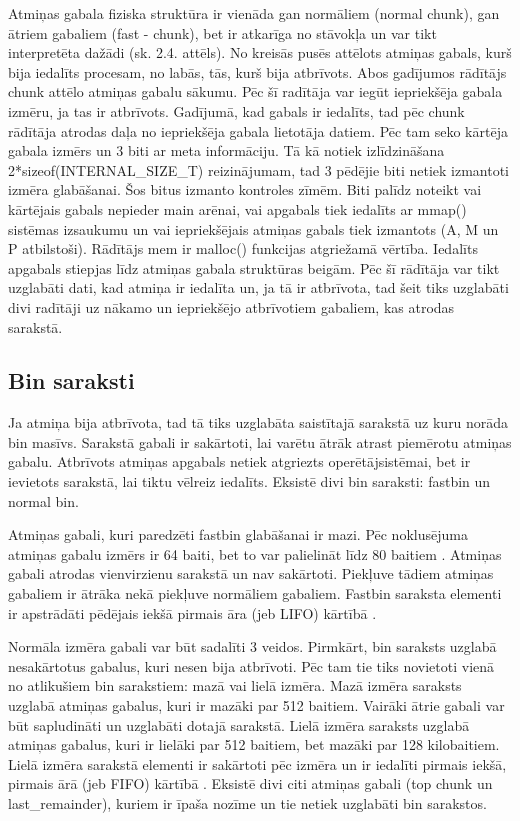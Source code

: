 Atmiņas gabala fiziska struktūra ir vienāda gan normāliem (normal chunk), gan ātriem gabaliem (fast - chunk), bet ir atkarīga no stāvokļa un var tikt interpretēta dažādi (sk. 2.4. attēls).
No kreisās pusēs attēlots atmiņas gabals, kurš bija iedalīts procesam, no labās, tās, kurš bija atbrīvots.
Abos gadījumos rādītājs chunk attēlo atmiņas gabalu sākumu. Pēc šī radītāja var iegūt iepriekšēja gabala izmēru, ja tas ir atbrīvots.
Gadījumā, kad gabals ir iedalīts, tad pēc chunk rādītāja atrodas daļa no iepriekšēja gabala lietotāja datiem. 
Pēc tam seko kārtēja gabala izmērs un 3 biti ar meta informāciju. 
Tā kā notiek izlīdzināšana 2*sizeof(INTERNAL\_SIZE\_T)  reizinājumam, tad 3 pēdējie biti netiek izmantoti izmēra glabāšanai. 
Šos bitus izmanto kontroles zīmēm.
Biti palīdz noteikt vai kārtējais gabals nepieder main arēnai, vai apgabals tiek iedalīts ar mmap() sistēmas izsaukumu un vai iepriekšējais atmiņas gabals tiek izmantots (A, M un P atbilstoši).
Rādītājs mem ir malloc() funkcijas atgriežamā vērtība. Iedalīts apgabals stiepjas līdz atmiņas gabala struktūras beigām.
Pēc šī rādītāja var tikt uzglabāti dati, kad atmiņa ir iedalīta un, ja tā ir atbrīvota, tad šeit tiks uzglabāti divi radītāji uz nākamo un iepriekšējo atbrīvotiem gabaliem, kas atrodas sarakstā. 
 
 \subsection{Bin saraksti}
Ja atmiņa bija atbrīvota, tad tā tiks uzglabāta saistītajā sarakstā uz kuru norāda bin masīvs.
Sarakstā gabali ir sakārtoti, lai varētu ātrāk atrast piemērotu atmiņas gabalu.
Atbrīvots atmiņas apgabals netiek atgriezts operētājsistēmai, bet ir ievietots sarakstā, lai tiktu vēlreiz iedalīts. Eksistē divi bin saraksti: fastbin un normal bin.

Atmiņas gabali, kuri paredzēti fastbin glabāšanai ir mazi. Pēc noklusējuma atmiņas gabalu izmērs ir 64 baiti, bet to var palielināt līdz 80 baitiem \cite {MALLOC}. 
Atmiņas gabali atrodas vienvirzienu sarakstā un nav sakārtoti. Piekļuve tādiem atmiņas gabaliem ir ātrāka nekā piekļuve normāliem gabaliem.
Fastbin saraksta elementi ir apstrādāti pēdējais iekšā pirmais āra (jeb LIFO) kārtībā \cite {Binning}.

Normāla izmēra gabali var būt sadalīti 3 veidos. Pirmkārt, bin saraksts uzglabā nesakārtotus gabalus, kuri nesen bija atbrīvoti.  
Pēc tam tie tiks novietoti vienā no atlikušiem bin sarakstiem: mazā vai lielā izmēra. 
Mazā izmēra saraksts uzglabā atmiņas gabalus, kuri ir mazāki par 512 baitiem. 
Vairāki ātrie gabali var būt sapludināti un uzglabāti dotajā sarakstā. 
Lielā izmēra saraksts uzglabā atmiņas gabalus, kuri ir lielāki par 512 baitiem, bet mazāki par 128 kilobaitiem. 
Lielā izmēra sarakstā elementi ir sakārtoti pēc izmēra un ir iedalīti pirmais iekšā, pirmais ārā (jeb FIFO) kārtībā \cite {Binning}. 
Eksistē divi citi atmiņas gabali (top chunk un last\_remainder), kuriem ir īpaša nozīme un tie netiek uzglabāti bin sarakstos. 

